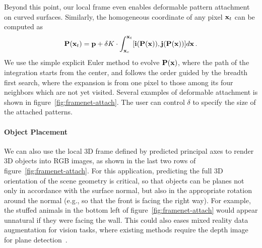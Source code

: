 Beyond this point, our local frame even enables deformable pattern attachment on curved surfaces. Similarly, the homogeneous coordinate of any pixel $\mathbf{x}_t$ can be computed as
\begin{equation}
    \mathbf{P}(\mathbf{x}_t)=\mathbf{p} + \delta K \cdot\int_{\mathbf{x}_c}^{\mathbf{x}_t} [\textbf{i}(\mathbf{P}(\mathbf{x})),\textbf{j}(\mathbf{P}(\mathbf{x}))] d\mathbf{x}\,.
\end{equation}
We use the simple explicit Euler method to evolve $\mathbf{P}(\mathbf{x})$, where the path of the integration starts from the center, and follows the order guided by the breadth first search, where the expansion is from one pixel to those among its four neighbors which are not yet visited. Several examples of deformable attachment is shown in figure~\ref{fig:framenet-attach}. The user can control $\delta$ to specify the size of the attached patterns.

\vspace{-0.1in}
\paragraph{Object Placement} We can also use the local 3D frame defined by predicted principal axes to render 3D objects into RGB images, as shown in the last two rows of figure~\ref{fig:framenet-attach}.  For this application, predicting the full 3D orientation of the scene geometry is critical, so that objects can be planes not only in accordance with the surface normal, but also in the appropriate rotation around the normal (e.g., so that the front is facing the right way).   For example, the stuffed animals in the bottom left of figure~\ref{fig:framenet-attach} would appear unnatural if they were facing the wall. This could also eases mixed reality data augmentation for vision tasks, where existing methods require the depth image for plane detection~\cite{wang2019normalized}.

